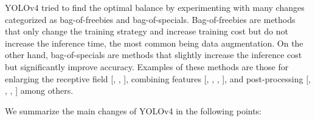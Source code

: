 \documentclass{article}
\begin{document}
YOLOv4 tried to find the optimal balance by experimenting with many changes categorized as bag-of-freebies and bag-of-specials. Bag-of-freebies are methods that only change the training strategy and increase training cost but do not increase the inference time, the most common being data augmentation. On the other hand, bag-of-specials are methods that slightly increase the inference cost but significantly improve accuracy. Examples of these methods are those  for enlarging the receptive field [\cite{he2015spatial}, \cite{chen2017deeplab}, \cite{liu2018receptive}], combining features [\cite{he2016deep}, \cite{lin2017feature}, \cite{hariharan2015hypercolumns}, \cite{zhao2019m2det}], and post-processing [\cite{he2015delving}, \cite{maas2013rectifier}, \cite{misra2019mish}, \cite{bodla2017soft}] among others.

We summarize the main changes of YOLOv4 in the following points:
\end{document}
